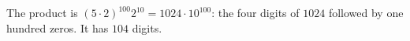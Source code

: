 The product is $(5\cdot2)^{100}2^{10}=1024\cdot10^{100}$: the four digits of $1024$ followed by one hundred zeros. It has $\boxed{104}$ digits.
